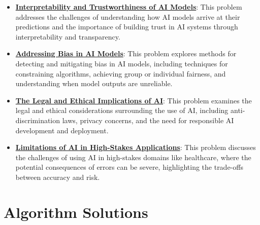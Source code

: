 \documentclass{article}%
\begin{document}
\begin{itemize}[leftmargin=*]
\item \href{https://purdue.brightspace.com/d2l/common/assets/pdfjs-d2l-dist/1.0.14-legacy/web/viewer.html?file=%2Fcontent%2Fenforced%2F1095467-wl.202510.CS.24300.001%2F16L2-ethics.pdf%3Fou%3D1095467&lang=en-us&container=d2l-fileviewer-rendered-pdf&fullscreen=d2l-fileviewer-rendered-pdf-dialog&height=667#page=29}{\textbf{Interpretability and Trustworthiness of AI Models}}: This problem addresses the challenges of understanding how AI models arrive at their predictions and the importance of building trust in AI systems through interpretability and transparency.%
\item \href{https://purdue.brightspace.com/d2l/common/assets/pdfjs-d2l-dist/1.0.14-legacy/web/viewer.html?file=%2Fcontent%2Fenforced%2F1095467-wl.202510.CS.24300.001%2F16L2-ethics.pdf%3Fou%3D1095467&lang=en-us&container=d2l-fileviewer-rendered-pdf&fullscreen=d2l-fileviewer-rendered-pdf-dialog&height=667#page=24}{\textbf{Addressing Bias in AI Models}}: This problem explores methods for detecting and mitigating bias in AI models, including techniques for constraining algorithms, achieving group or individual fairness, and understanding when model outputs are unreliable.%
\item \href{https://purdue.brightspace.com/d2l/common/assets/pdfjs-d2l-dist/1.0.14-legacy/web/viewer.html?file=%2Fcontent%2Fenforced%2F1095467-wl.202510.CS.24300.001%2F16L2-ethics.pdf%3Fou%3D1095467&lang=en-us&container=d2l-fileviewer-rendered-pdf&fullscreen=d2l-fileviewer-rendered-pdf-dialog&height=667#page=9}{\textbf{The Legal and Ethical Implications of AI}}: This problem examines the legal and ethical considerations surrounding the use of AI, including anti-discrimination laws, privacy concerns, and the need for responsible AI development and deployment.%
\item \href{https://purdue.brightspace.com/d2l/common/assets/pdfjs-d2l-dist/1.0.14-legacy/web/viewer.html?file=%2Fcontent%2Fenforced%2F1095467-wl.202510.CS.24300.001%2F16L2-ethics.pdf%3Fou%3D1095467&lang=en-us&container=d2l-fileviewer-rendered-pdf&fullscreen=d2l-fileviewer-rendered-pdf-dialog&height=667#page=32}{\textbf{Limitations of AI in High-Stakes Applications}}: This problem discusses the challenges of using AI in high-stakes domains like healthcare, where the potential consequences of errors can be severe, highlighting the trade-offs between accuracy and risk.%
\end{itemize}

%
\section{Algorithm Solutions}%
\label{sec:AlgorithmSolutions}%
\end{document}
